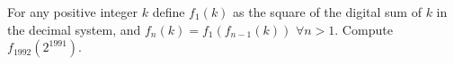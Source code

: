 For any positive integer $k$ define $f_1(k)$ as the square of the digital sum of $k$ in the decimal system, and $f_{n}(k)=f_1(f_{n-1}(k))$ $\forall n>1$. Compute $f_{1992}(2^{1991})$.
